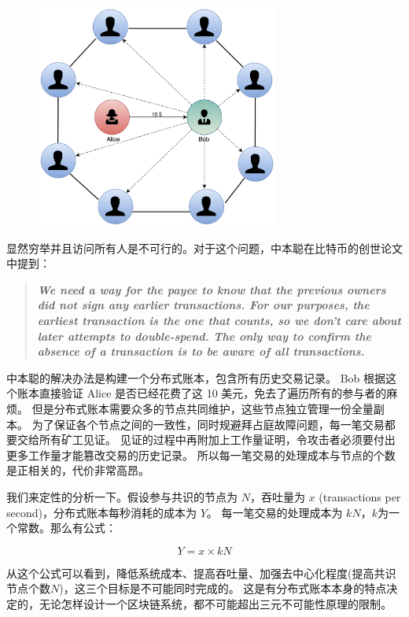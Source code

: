 \begin{figure}[h!]
    \centering
    \includegraphics[width=8cm, keepaspectratio]{../images/Gossip.png}
    \caption{}
    \label{fig:gossip}
\end{figure}
\newpage
显然穷举并且访问所有人是不可行的。对于这个问题，中本聪在比特币的创世论文中提到：

\begin{quote}
    \textbf{\textit{We need a way for the payee to know that the previous owners did not sign any earlier transactions. 
            For our purposes, the earliest transaction is the one that counts, so we don't care about later attempts to double-spend. 
            The only way to confirm the absence of a transaction is to be aware of all transactions.}}
\end{quote}

中本聪的解决办法是构建一个分布式账本，包含所有历史交易记录。
Bob 根据这个账本直接验证 Alice 是否已经花费了这 10 美元，免去了遍历所有的参与者的麻烦。
但是分布式账本需要众多的节点共同维护，这些节点独立管理一份全量副本。
为了保证各个节点之间的一致性，同时规避拜占庭故障问题，每一笔交易都要交给所有矿工见证。
见证的过程中再附加上工作量证明，令攻击者必须要付出更多工作量才能篡改交易的历史记录。
所以每一笔交易的处理成本与节点的个数是正相关的，代价非常高昂。

我们来定性的分析一下。假设参与共识的节点为 $N$，吞吐量为 $x$ (transactions per second)，分布式账本每秒消耗的成本为 $Y$。
每一笔交易的处理成本为 $kN$，$k$为一个常数。那么有公式：

\begin{equation}\label{equ:cost}
Y = x \times kN 
\end{equation}

从这个公式可以看到，降低系统成本、提高吞吐量、加强去中心化程度(提高共识节点个数$N$)，这三个目标是不可能同时完成的。
这是有分布式账本本身的特点决定的，无论怎样设计一个区块链系统，都不可能超出三元不可能性原理的限制。

